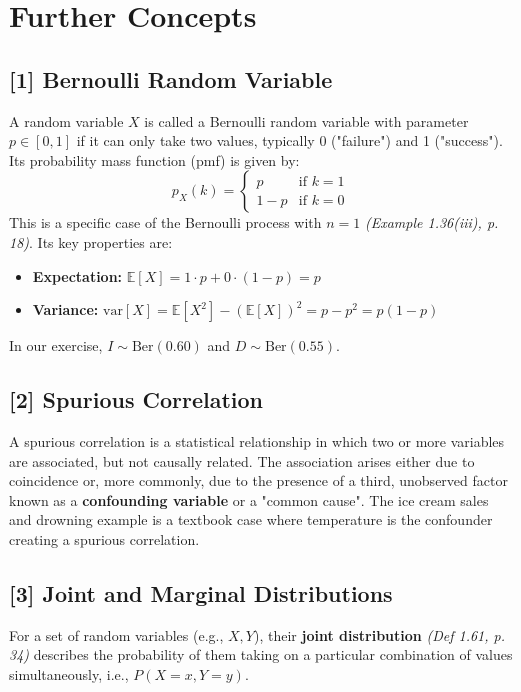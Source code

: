 \documentclass[11pt,a4paper]{article}
\newcommand{\scriptcite}[2]{\textit{(#1, p. #2)}}
\newcommand{\E}{\mathbb{E}}
\newcommand{\var}{\text{var}}
\begin{document}
\newpage
\section{Further Concepts}

\hypertarget{note1}{}\subsection*{[1] Bernoulli Random Variable}
A random variable $X$ is called a Bernoulli random variable with parameter $p \in [0,1]$ if it can only take two values, typically 0 ("failure") and 1 ("success"). Its probability mass function (pmf) is given by:
\[ p_X(k) = \begin{cases} p & \text{if } k=1 \\ 1-p & \text{if } k=0 \end{cases} \]
This is a specific case of the Bernoulli process with $n=1$ \scriptcite{Example 1.36(iii)}{18}. Its key properties are:
\begin{itemize}
    \item \textbf{Expectation:} $\E[X] = 1 \cdot p + 0 \cdot (1-p) = p$
    \item \textbf{Variance:} $\var[X] = \E[X^2] - (\E[X])^2 = p - p^2 = p(1-p)$
\end{itemize}
In our exercise, $I \sim \text{Ber}(0.60)$ and $D \sim \text{Ber}(0.55)$.

\hypertarget{note2}{}\subsection*{[2] Spurious Correlation}
A spurious correlation is a statistical relationship in which two or more variables are associated, but not causally related. The association arises either due to coincidence or, more commonly, due to the presence of a third, unobserved factor known as a \textbf{confounding variable} or a "common cause". The ice cream sales and drowning example is a textbook case where temperature is the confounder creating a spurious correlation.

\hypertarget{note3}{}\subsection*{[3] Joint and Marginal Distributions}
For a set of random variables (e.g., $X, Y$), their \textbf{joint distribution} \scriptcite{Def 1.61}{34} describes the probability of them taking on a particular combination of values simultaneously, i.e., $P(X=x, Y=y)$.
\end{document}
